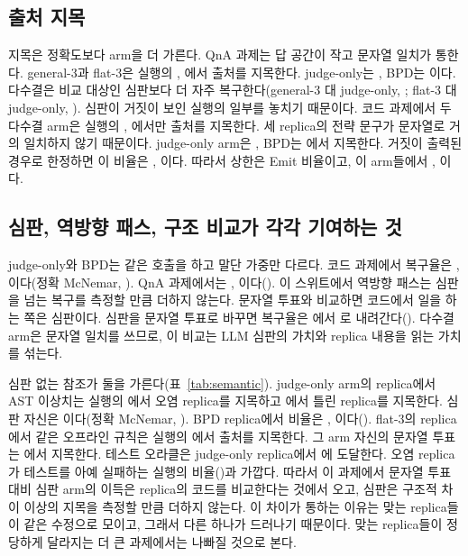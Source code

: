 \documentclass[11pt]{article}
\begin{document}
\subsection{출처 지목}
지목은 정확도보다 arm을 더 가른다.
QnA 과제는 답 공간이 작고 문자열 일치가 통한다. general-3과 flat-3은 실행의 \RateMainGenThreeQnaDet{}, \RateMainFlatThreeQnaDet{}에서 출처를 지목한다. judge-only는 \RateMainJudgeOnlyQnaDet{}, BPD는 \RateMainBpdQnaDet{}이다.
다수결은 비교 대상인 심판보다 더 자주 복구한다(general-3 대 judge-only, \PvalMainQnaRecGenThreevsJudgeOnly{}; flat-3 대 judge-only, \PvalMainQnaRecFlatThreevsJudgeOnly{}). 심판이 거짓이 보인 실행의 일부를 놓치기 때문이다.
코드 과제에서 두 다수결 arm은 실행의 \RateMainGenThreeCodeDet{}, \RateMainFlatThreeCodeDet{}에서만 출처를 지목한다. 세 replica의 전략 문구가 문자열로 거의 일치하지 않기 때문이다.
judge-only arm은 \RateMainJudgeOnlyCodeDet{}, BPD는 \RateMainBpdCodeDet{}에서 지목한다. 거짓이 출력된 경우로 한정하면 이 비율은 \RateMainJudgeOnlyCodeDetEmit{}, \RateMainBpdCodeDetEmit{}이다.
따라서 상한은 Emit 비율이고, 이 arm들에서 \RateMainJudgeOnlyCodeEmit{}, \RateMainBpdCodeEmit{}이다.

\subsection{심판, 역방향 패스, 구조 비교가 각각 기여하는 것}
judge-only와 BPD는 같은 호출을 하고 말단 가중만 다르다.
코드 과제에서 복구율은 \RateMainJudgeOnlyCodeRec{}, \RateMainBpdCodeRec{}이다(정확 McNemar, \PvalMainCodeRecJudgeOnlyvsBpd{}). QnA 과제에서는 \RateMainJudgeOnlyQnaRec{}, \RateMainBpdQnaRec{}이다(\PvalMainQnaRecJudgeOnlyvsBpd{}).
이 스위트에서 역방향 패스는 심판을 넘는 복구를 측정할 만큼 더하지 않는다.
문자열 투표와 비교하면 코드에서 일을 하는 쪽은 심판이다. 심판을 문자열 투표로 바꾸면 복구율은 \RateMainJudgeOnlyCodeRec{}에서 \RateMainFlatThreeCodeRec{}로 내려간다(\PvalMainCodeRecFlatThreevsJudgeOnly{}).
다수결 arm은 문자열 일치를 쓰므로, 이 비교는 LLM 심판의 가치와 replica 내용을 읽는 가치를 섞는다.



심판 없는 참조가 둘을 가른다(표~\ref{tab:semantic}).
judge-only arm의 replica에서 AST 이상치는 실행의 \RateSemMainJudgeOnlyCodeAst{}에서 오염 replica를 지목하고 \RateSemMainJudgeOnlyCodeAstWrong{}에서 틀린 replica를 지목한다. 심판 자신은 \RateSemMainJudgeOnlyCodeMethod{}이다(정확 McNemar, \PvalSemMainJudgeOnlyCodeMethodVsAst{}). BPD replica에서 비율은 \RateSemMainBpdCodeAst{}, \RateSemMainBpdCodeMethod{}이다(\PvalSemMainBpdCodeMethodVsAst{}).
flat-3의 replica에서 같은 오프라인 규칙은 실행의 \RateSemMainFlatThreeCodeAst{}에서 출처를 지목한다. 그 arm 자신의 문자열 투표는 \RateSemMainFlatThreeCodeMethod{}에서 지목한다.
테스트 오라클은 judge-only replica에서 \RateSemMainJudgeOnlyCodeOracle{}에 도달한다. 오염 replica가 테스트를 아예 실패하는 실행의 비율(\RateSemMainJudgeOnlyCodePoisonedFails{})과 가깝다.
따라서 이 과제에서 문자열 투표 대비 심판 arm의 이득은 replica의 코드를 비교한다는 것에서 오고, 심판은 구조적 차이 이상의 지목을 측정할 만큼 더하지 않는다.
이 차이가 통하는 이유는 맞는 replica들이 같은 수정으로 모이고, 그래서 다른 하나가 드러나기 때문이다. 맞는 replica들이 정당하게 달라지는 더 큰 과제에서는 나빠질 것으로 본다.
\end{document}
